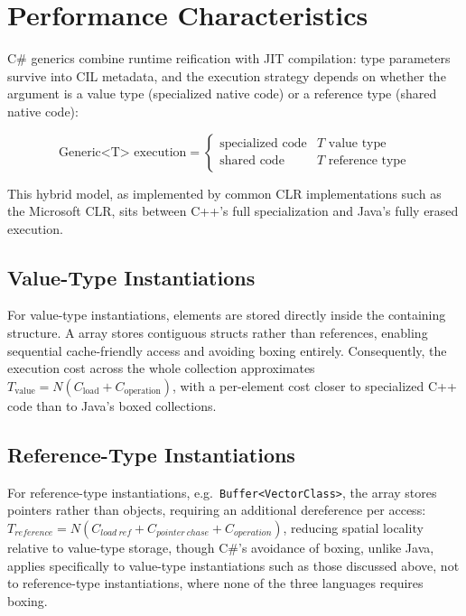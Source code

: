 \documentclass[11pt]{report}
\begin{document}

\section{Performance Characteristics}
\label{CSharpGenerics:Performance}


C\# generics combine runtime reification with JIT compilation: type
parameters survive into CIL metadata, and the execution strategy depends on
whether the argument is a value type (specialized native code) or a
reference type (shared native code):

\[
\text{Generic<T> execution} =
\begin{cases}
\text{specialized code} & T \text{ value type}\\
\text{shared code} & T \text{ reference type}
\end{cases}
\]

This hybrid model, as implemented by common CLR implementations such as
the Microsoft CLR, sits between C++'s full specialization and Java's fully
erased execution.

\subsection{Value-Type Instantiations}
\label{CSharpGenerics:Performance:ValueType}

For value-type instantiations, elements are stored directly inside the
containing structure. A  array stores contiguous
structs rather than references, enabling sequential cache-friendly access
and avoiding boxing entirely. Consequently, the execution cost across the 
whole collection approximates $T_{\text{value}} = N(C_{\text{load}} + C_{\text{operation}})$, 
with a per-element cost closer to specialized C++ code than to Java's 
boxed collections.

\subsection{Reference-Type Instantiations}
\label{CSharpGenerics:Performance:ReferenceType}
For reference-type instantiations, e.g.\ \texttt{Buffer<VectorClass>}, the
array stores pointers rather than objects, requiring an additional
dereference per access:
$T_{reference} = N(C_{load\ ref} + C_{pointer\ chase} + C_{operation})$,
reducing spatial locality relative to value-type storage, though C\#'s avoidance of boxing, 
unlike Java, applies specifically to
value-type instantiations such as those discussed above, not to
reference-type instantiations, where none of the three languages requires
boxing.
\end{document}
